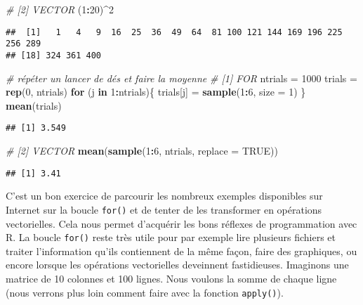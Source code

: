 \documentclass[]{book}
\newenvironment{Shaded}{\begin{snugshade}}{\end{snugshade}}
\newcommand{\KeywordTok}[1]{\textcolor[rgb]{0.13,0.29,0.53}{\textbf{#1}}}
\newcommand{\DataTypeTok}[1]{\textcolor[rgb]{0.13,0.29,0.53}{#1}}
\newcommand{\DecValTok}[1]{\textcolor[rgb]{0.00,0.00,0.81}{#1}}
\newcommand{\StringTok}[1]{\textcolor[rgb]{0.31,0.60,0.02}{#1}}
\newcommand{\CommentTok}[1]{\textcolor[rgb]{0.56,0.35,0.01}{\textit{#1}}}
\newcommand{\OtherTok}[1]{\textcolor[rgb]{0.56,0.35,0.01}{#1}}
\newcommand{\ControlFlowTok}[1]{\textcolor[rgb]{0.13,0.29,0.53}{\textbf{#1}}}
\newcommand{\OperatorTok}[1]{\textcolor[rgb]{0.81,0.36,0.00}{\textbf{#1}}}
\newcommand{\NormalTok}[1]{#1}
\theoremstyle{definition}
\theoremstyle{definition}
\theoremstyle{definition}
\theoremstyle{remark}
\begin{document}
\begin{Shaded}
\begin{Highlighting}[]
\CommentTok{# [2] VECTOR}
\NormalTok{(}\DecValTok{1}\OperatorTok{:}\DecValTok{20}\NormalTok{)}\OperatorTok{^}\DecValTok{2}
\end{Highlighting}
\end{Shaded}

\begin{verbatim}
##  [1]   1   4   9  16  25  36  49  64  81 100 121 144 169 196 225 256 289
## [18] 324 361 400
\end{verbatim}

\begin{Shaded}
\begin{Highlighting}[]
\CommentTok{# répéter un lancer de dés et faire la moyenne}
\CommentTok{# [1] FOR}
\NormalTok{ntrials =}\StringTok{ }\DecValTok{1000}
\NormalTok{trials =}\StringTok{ }\KeywordTok{rep}\NormalTok{(}\DecValTok{0}\NormalTok{, ntrials)}
\ControlFlowTok{for}\NormalTok{ (j }\ControlFlowTok{in} \DecValTok{1}\OperatorTok{:}\NormalTok{ntrials)\{}
\NormalTok{  trials[j] =}\StringTok{ }\KeywordTok{sample}\NormalTok{(}\DecValTok{1}\OperatorTok{:}\DecValTok{6}\NormalTok{, }\DataTypeTok{size =} \DecValTok{1}\NormalTok{)}
\NormalTok{\}}
\KeywordTok{mean}\NormalTok{(trials)}
\end{Highlighting}
\end{Shaded}

\begin{verbatim}
## [1] 3.549
\end{verbatim}

\begin{Shaded}
\begin{Highlighting}[]
\CommentTok{# [2] VECTOR}
\KeywordTok{mean}\NormalTok{(}\KeywordTok{sample}\NormalTok{(}\DecValTok{1}\OperatorTok{:}\DecValTok{6}\NormalTok{, ntrials, }\DataTypeTok{replace =} \OtherTok{TRUE}\NormalTok{))}
\end{Highlighting}
\end{Shaded}

\begin{verbatim}
## [1] 3.41
\end{verbatim}

C'est un bon exercice de parcourir les nombreux exemples disponibles sur
Internet sur la boucle \texttt{for()} et de tenter de les transformer en
opérations vectorielles. Cela nous permet d'acquérir les bons réflexes
de programmation avec R. La boucle \texttt{for()} reste très utile pour
par exemple lire plusieurs fichiers et traiter l'information qu'ils
contiennent de la même façon, faire des graphiques, ou encore lorsque
les opérations vectorielles deveinnent fastidieuses. Imaginons une
matrice de 10 colonnes et 100 lignes. Nous voulons la somme de chaque
ligne (nous verrons plus loin comment faire avec la fonction
\texttt{apply()}).
\end{document}

